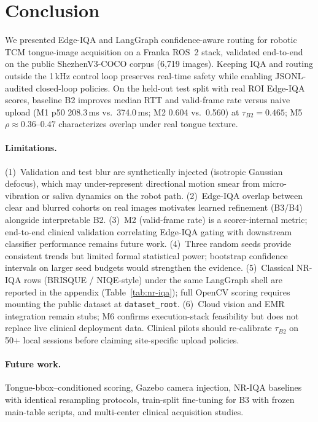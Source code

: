 \section{Conclusion}
\label{sec:conclusion}

We presented Edge-IQA and LangGraph confidence-aware routing for robotic TCM tongue-image acquisition on a Franka ROS~2 stack, validated end-to-end on the public ShezhenV3-COCO corpus (6{,}719 images).
Keeping IQA and routing outside the 1\,kHz control loop preserves real-time safety while enabling JSONL-audited closed-loop policies.
On the held-out test split with real ROI Edge-IQA scores, baseline B2 improves median RTT and valid-frame rate versus naive upload (M1 p50 208.3\,ms vs.\ 374.0\,ms; M2 0.604 vs.\ 0.560) at $\tau_{B2}{=}0.465$; M5 $\rho{\approx}0.36$--$0.47$ characterizes overlap under real tongue texture.

\paragraph{Limitations.}
(1)~Validation and test blur are synthetically injected (isotropic Gaussian defocus), which may under-represent directional motion smear from micro-vibration or saliva dynamics on the robot path.
(2)~Edge-IQA overlap between clear and blurred cohorts on real images motivates learned refinement (B3/B4) alongside interpretable B2.
(3)~M2 (valid-frame rate) is a scorer-internal metric; end-to-end clinical validation correlating Edge-IQA gating with downstream classifier performance remains future work.
(4)~Three random seeds provide consistent trends but limited formal statistical power; bootstrap confidence intervals on larger seed budgets would strengthen the evidence.
(5)~Classical NR-IQA rows (BRISQUE / NIQE-style) under the same LangGraph shell are reported in the appendix (Table~\ref{tab:nr-iqa}); full OpenCV scoring requires mounting the public dataset at \texttt{dataset\_root}.
(6)~Cloud vision and EMR integration remain stubs; M6 confirms execution-stack feasibility but does not replace live clinical deployment data.
Clinical pilots should re-calibrate $\tau_{B2}$ on 50+ local sessions before claiming site-specific upload policies.

\paragraph{Future work.}
Tongue-bbox--conditioned scoring, Gazebo camera injection, NR-IQA baselines with identical resampling protocols, train-split fine-tuning for B3 with frozen main-table scripts, and multi-center clinical acquisition studies.
